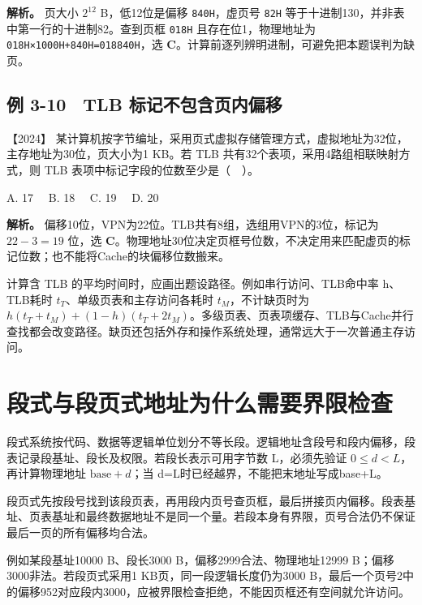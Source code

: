 
\textbf{解析。} 页大小 \(2^{12}\) B，低12位是偏移 \allowbreak{}\texttt{840H}，虚页号 \allowbreak{}\texttt{82H} 等于十进制130，并非表中第一行的十进制82。查到页框 \allowbreak{}\texttt{018H} 且存在位1，物理地址为 \allowbreak{}\texttt{018H×1000H+840H=018840H}，选 \textbf{C}。计算前逐列辨明进制，可避免把本题误判为缺页。

\subsection{例 3-10　TLB 标记不包含页内偏移}\label{co-ex3-10}

\noindent{}【2024】 某计算机按字节编址，采用页式虚拟存储管理方式，虚拟地址为32位，主存地址为30位，页大小为1 KB。若 TLB 共有32个表项，采用4路组相联映射方式，则 TLB 表项中标记字段的位数至少是（　）。

A. 17　 B. 18　 C. 19　 D. 20


\textbf{解析。} 偏移10位，VPN为22位。TLB共有8组，选组用VPN的3位，标记为 \(22-3=19\) 位，选 \textbf{C}。物理地址30位决定页框号位数，不决定用来匹配虚页的标记位数；也不能将Cache的块偏移位数搬来。

计算含 TLB 的平均时间时，应画出题设路径。例如串行访问、TLB命中率 h、TLB耗时 \(t_T\)、单级页表和主存访问各耗时 \(t_M\)，不计缺页时为 \(h(t_T+t_M)+(1-h)(t_T+2t_M)\)。多级页表、页表项缓存、TLB与Cache并行查找都会改变路径。缺页还包括外存和操作系统处理，通常远大于一次普通主存访问。

\section{段式与段页式地址为什么需要界限检查}\label{co-03-13}

段式系统按代码、数据等逻辑单位划分不等长段。逻辑地址含段号和段内偏移，段表记录段基址、段长及权限。若段长表示可用字节数 L，必须先验证 \(0\le d<L\)，再计算物理地址 \(\mathrm{base}+d\)；当 d=L时已经越界，不能把末地址写成base+L。

段页式先按段号找到该段页表，再用段内页号查页框，最后拼接页内偏移。段表基址、页表基址和最终数据地址不是同一个量。若段本身有界限，页号合法仍不保证最后一页的所有偏移均合法。

例如某段基址10000 B、段长3000 B，偏移2999合法、物理地址12999 B；偏移3000非法。若段页式采用1 KB页，同一段逻辑长度仍为3000 B，最后一个页号2中的偏移952对应段内3000，应被界限检查拒绝，不能因页框还有空间就允许访问。

